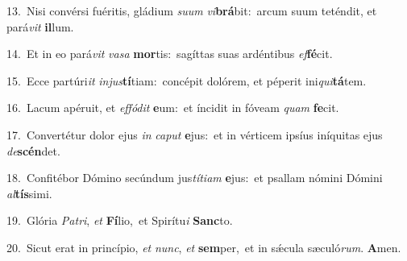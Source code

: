 {\numbfont\textcolor{\numbcolor}{13.}}~Nisi convérsi fuéritis, gládium \textit{su}\-\textit{um} \textit{vi}\-\textbf{brá}bit:~\star arcum suum teténdit, et pará\textit{vit} \textbf{il}\-lum.\par
{\numbfont\textcolor{\numbcolor}{14.}}~Et in eo pará\textit{vit} \textit{va}\-\textit{sa} \textbf{mor}\-tis:~\star sagíttas suas ardéntibus \textit{ef}\-\textbf{fé}cit.\par
{\numbfont\textcolor{\numbcolor}{15.}}~Ecce partúri\textit{it} \textit{in}\-\textit{jus}\textbf{tí}tiam:~\star concépit dolórem, et péperit ini\-\textit{qui}\-\textbf{tá}tem.\par
{\numbfont\textcolor{\numbcolor}{16.}}~Lacum apéruit, et \textit{ef}\-\textit{fó}\textit{dit} \textbf{e}\-um:~\star et íncidit in fóveam \textit{quam} \textbf{fe}\-cit.\par
{\numbfont\textcolor{\numbcolor}{17.}}~Convertétur dolor ejus \textit{in} \textit{ca}\-\textit{put} \textbf{e}\-jus:~\star et in vérticem ipsíus iníquitas ejus \textit{de}\-\textbf{scén}det.\par
{\numbfont\textcolor{\numbcolor}{18.}}~Confitébor Dómino secúndum jus\-\textit{tí}\-\textit{ti}\textit{am} \textbf{e}\-jus:~\star et psallam nómini Dómini \textit{al}\-\textbf{tís}simi.\par
{\numbfont\textcolor{\numbcolor}{19.}}~Glória \textit{Pa}\-\textit{tri}, \textit{et} \textbf{Fí}\-lio,~\star et Spirítu\textit{i} \textbf{Sanc}\-to.\par
{\numbfont\textcolor{\numbcolor}{20.}}~Sicut erat in princípio, \textit{et} \textit{nunc}\-, \textit{et} \textbf{sem}\-per,~\star et in sǽcula sæculó\-\textit{rum}\-. \textbf{A}\-men.\par
